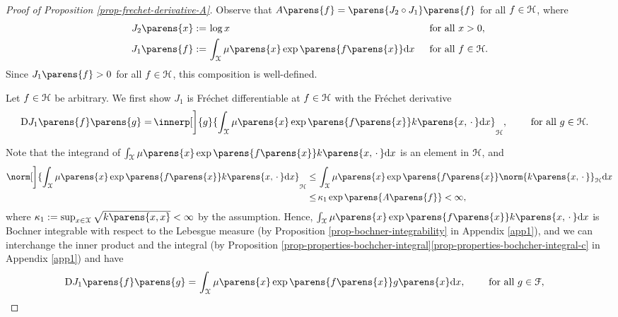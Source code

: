\begin{proof}[Proof of Proposition \ref{prop-frechet-derivative-A}]
	
	Observe that $A \parens{f} = \parens{J_2 \circ J_1} \parens{f}$ for all $f \in \mathcal{H}$, where 
	\begin{align*}
		J_2 \parens{x} := & \, \log x && \, \text{ for all } x > 0,  \\ 
		J_1 \parens{f} := & \, \int_{\calX} \mu \parens{x} \exp \parens{ f \parens{x}} \diff x && \, \text{ for all } f \in \calH. 
	\end{align*}
	Since $J_1 \parens{f} > 0$ for all $f \in \mathcal{H}$, this composition is well-defined. 
	
	Let $f \in \mathcal{H}$ be arbitrary. We first show $J_1$ is Fr{\'e}chet differentiable at $f \in \mathcal{H}$ with the Fr{\'e}chet derivative
	\begin{align*}
		\Diff J_1 \parens{f} \parens{g} = & \, \innerp[\bigg]{g}{\int_{\calX} \mu \parens{x} \exp \parens{ f \parens{x} } k \parens{x, \,\cdot\,} \diff x}_{\calH}, \qquad \text{ for all } g \in \calH. 
	\end{align*}
	
	Note that the integrand of $\int_{\calX} \mu \parens{x} \exp \parens{ f \parens{x} } k \parens{x, \,\cdot\,} \diff x$ is an element in $\mathcal{H}$, and 
	\begin{align*}
		\norm[\bigg]{\int_{\calX} \mu \parens{x} \exp \parens{ f \parens{x} } k \parens{x, \,\cdot\,} \diff x}_{\calH} \le & \, \int_{\calX} \mu \parens{x} \exp \parens{ f \parens{x} } \norm{ k \parens{x, \,\cdot\,}}_{\calH} \diff x \\ 
		\le & \, \kappa_1 \exp \parens{A \parens{f}} < \infty, 
	\end{align*}
	where $\kappa_1 := \sup_{x \in \calX} \sqrt{k \parens{x, x}} < \infty$ by the assumption. Hence, $\int_{\calX} \mu \parens{x} \exp \parens{ f \parens{x} } k \parens{x, \,\cdot\,} \diff x$ is Bochner integrable with respect to the Lebesgue measure (by Proposition \ref{prop-bochner-integrability} in Appendix \ref{app1}), and we can interchange the inner product and the integral (by Proposition \ref{prop-properties-bochcher-integral}\ref{prop-properties-bochcher-integral-c} in Appendix \ref{app1}) and have 
	\begin{align*}
		\Diff J_1 \parens{f} \parens{g} %
		= & \, \int_{\calX} \mu \parens{x} \exp \parens{ f \parens{x} } g \parens{x} \diff x, \qquad \text{ for all } g \in \calF, 
	\end{align*}
	

\end{proof}
